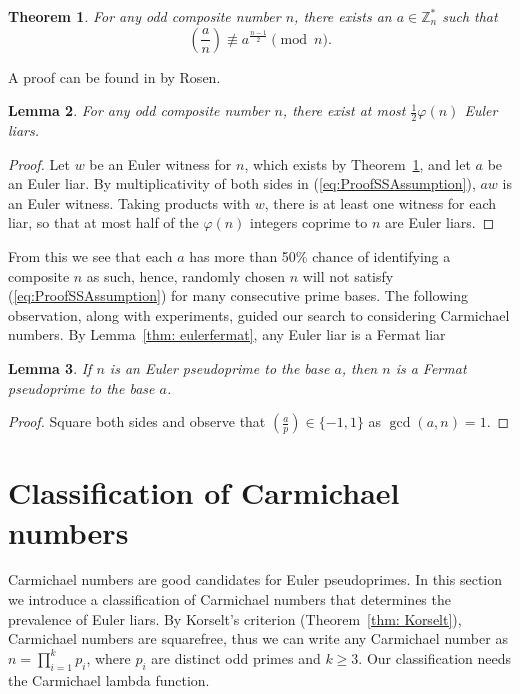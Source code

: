 \documentclass[runningheads]{amsart}
\newtheorem{theorem}{Theorem}
\newtheorem{lemma}[theorem]{Lemma}
\newcommand{\Z}{\mathbb{Z}}
\begin{document}
\begin{theorem}
\label{lem:solovay-strassen}
For any odd composite number
\(
n
\),
there exists an
$a\in
\Z_n^*$
such that
\begin{equation*}
\left( \frac{a}{n} \right)  \not \equiv  a^{\frac{n-1}{2}} \pmod{n}.
\label{eq: SS non equal}
\end{equation*}
\end{theorem}
A proof can be found in
\cite{Rosen19861984}
by Rosen.
\begin{lemma}\label{lem:max-phi}
For any odd composite number
\(
n
\),
there exist at most
$\frac{1}{2}
\varphi(n)$
Euler liars.
\end{lemma}
\begin{proof}
Let $w$ be an Euler witness for $n$,
which exists by
Theorem~\ref{lem:solovay-strassen},
and let $a$ be an Euler liar.
By multiplicativity of both sides in
(\ref{eq:ProofSSAssumption}),
$aw$ is an Euler witness.
Taking products with $w$,
there is at least one witness for each liar,
so that at most half of the
$\varphi(n)$
integers coprime to $n$ are Euler liars.
\end{proof}
\relax

From this we see that each $a$ has more than
50\%
chance of identifying a composite $n$ as such,
hence,
randomly chosen $n$ will not satisfy
(\ref{eq:ProofSSAssumption})
for many consecutive prime bases.
The following observation,
along with experiments,
guided our search to considering Carmichael numbers.
By
Lemma~\ref{thm:
eulerfermat},
any Euler liar is a Fermat liar

\begin{lemma}
If $n$ is an Euler pseudoprime to the base $a$,
then $n$ is a Fermat pseudoprime to the base $a$.
\label{thm: eulerfermat}
\end{lemma}
\begin{proof}
Square both sides and observe that
$\left(
\frac{a}{p}\right)
\in
\{-1,1\}$
as
$\gcd(a,n)=1$.
\end{proof}


\section{Classification of Carmichael numbers} \label{ch:carmichael_numbers}
Carmichael numbers are good candidates for Euler pseudoprimes.
In this section we introduce a classification of Carmichael numbers that determines
the prevalence of Euler liars.
By Korselt's criterion
(Theorem~\ref{thm:
Korselt}),
Carmichael numbers are squarefree,
thus we can write any Carmichael number as $n =
\prod_{i
=1}^{k}p_i$,
where
$p_i$
are distinct odd primes and $k
\geq
3$.
Our classification needs the Carmichael lambda function.
\end{document}
